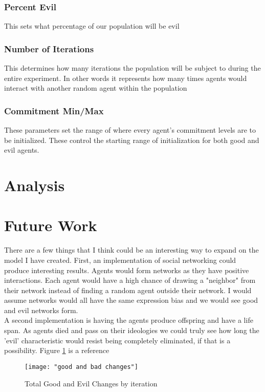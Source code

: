 \documentclass[]{article}
\begin{document}
\subsubsection{Percent Evil}
This sets what percentage of our population will be evil
\subsubsection{Number of Iterations}
This determines how many iterations the population will be subject to during the entire experiment. In other words it represents how many times agents would interact with another random agent within the population 
\subsubsection{Commitment Min/Max}
These parameters set the range of where every agent's commitment levels are to be initialized. These control the starting range of initialization for both good and evil agents.


\section{Analysis}


\section{Future Work}
There are a few things that I think could be an interesting way to expand on the model I have created. First, an implementation of social networking could produce interesting results. Agents would form networks as they have positive interactions. Each agent would have a high chance of drawing a "neighbor" from their network instead of finding a random agent outside their network. I would assume networks would all have the same expression bias and we would see good and evil networks form. \\
A second implementation is having the agents produce offspring and have a life span. As agents died and pass on their ideologies we could truly see how long the 'evil' characteristic would resist being completely eliminated, if that is a possibility.
Figure \ref{fig:good and bad changes} is a reference

\newpage

\begin{figure}
	\centering
	\texttt{[image: "good and bad changes"]}
	\caption{Total Good and Evil Changes by iteration}
	\label{fig:good and bad changes}
\end{figure}
\end{document}
